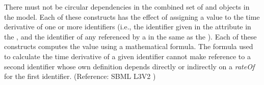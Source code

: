 There must not be circular dependencies in the combined set of \RateRule and \KineticLaw objects in the model.  Each of these constructs has the effect of assigning a value to the time derivative of one or more identifiers (i.e., the identifier given in the attribute  in the \RateRule, and the identifier of any \Species referenced by a \SpeciesReference in the same \Reaction as the \KineticLaw).  Each of these constructs computes the value using a mathematical formula.  The formula used to calculate the time derivative of a given identifier cannot make reference to a second identifier whose own definition depends directly or indirectly on a \emph{rateOf}  for the first identifier.  (Reference: SBML L3V2 )
